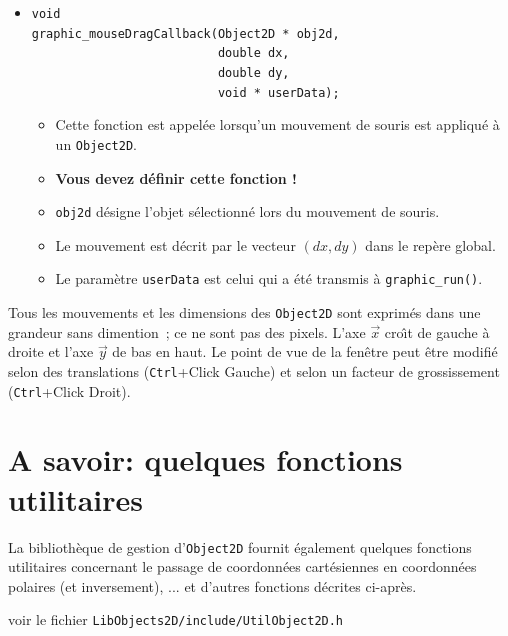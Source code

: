 \documentclass[12pt]{article}
\begin{document}
\begin{itemize}
\begin{itemize}
            transmis \`a \verb!graphic_run()!.
      \end{itemize}
\item \verb!void! \\
      \verb!graphic_mouseDragCallback(Object2D * obj2d,! \\
      \verb!                          double dx,! \\
      \verb!                          double dy,! \\
      \verb!                          void * userData);!
      \begin{itemize}
      \item Cette fonction est appel\'ee lorsqu'un mouvement de souris
            est appliqu\'e \`a un \verb!Object2D!.
      \item \textbf{Vous devez d\'efinir cette fonction !}
      \item \verb!obj2d! d\'esigne l'objet s\'electionn\'e lors du
            mouvement de souris.
      \item Le mouvement est d\'ecrit par le vecteur $(dx,dy)$ dans le
            rep\`ere global.
      \item Le param\`etre \verb!userData! est celui qui a \'et\'e
            transmis \`a \verb!graphic_run()!.
      \end{itemize}
\end{itemize}

Tous les mouvements et les dimensions des \verb!Object2D! sont exprim\'es
dans une grandeur sans dimention~; ce ne sont pas des pixels.
L'axe $\vec{x}$ cro{\^\i}t de gauche \`a droite et l'axe $\vec{y}$ de bas
en haut. Le point de vue de la fen\^etre peut \^etre modifi\'e selon des
translations (\verb!Ctrl!+Click Gauche) et selon un facteur de grossissement
(\verb!Ctrl!+Click Droit).

\section{A savoir: quelques fonctions utilitaires}

La biblioth\`eque de gestion d'{\tt Object2D} fournit \'egalement quelques
fonctions utilitaires concernant le passage de coordonn\'ees
cart\'esiennes en coordonn\'ees polaires (et inversement), ... et
d'autres fonctions d\'ecrites ci-apr\`es.
\begin{center}
voir le fichier {\tt LibObjects2D/include/UtilObject2D.h}
\end{center}
\end{document}
